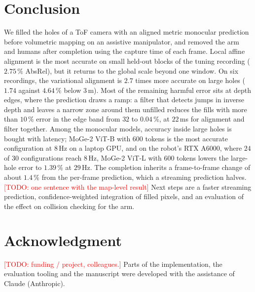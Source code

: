 \documentclass[conference]{IEEEtran}
\newcommand{\todo}[1]{\textcolor{red}{[TODO: #1]}}
\begin{document}
\section{Conclusion}
\label{sec:conclusion}
We filled the holes of a ToF camera with an aligned metric monocular
prediction before volumetric mapping on an assistive manipulator, and removed
the arm and humans after completion using the capture time of each frame. Local
affine alignment is the most accurate on small held-out blocks of the tuning
recording (\(2.75\,\%\) AbsRel), but it returns to the global scale beyond one
window. On six recordings, the variational alignment is \(2.7\) times more
accurate on large holes (\(1.74\) against \(4.64\,\%\) below \(3\,\)m). Most of
the remaining harmful error sits at depth edges, where the prediction draws a
ramp: a filter that detects jumps in inverse depth and leaves a narrow zone
around them unfilled reduces the fills with more than \(10\,\%\) error in the
edge band from \(32\) to \(0.04\,\%\), at \(22\,\)ms for alignment and filter
together. Among the monocular models,
accuracy inside large holes is bought with latency; MoGe-2 ViT-B with \(600\)
tokens is the most accurate configuration at \(8\,\)Hz on a laptop GPU, and on
the robot's RTX A6000, where \(24\) of \(30\) configurations reach \(8\,\)Hz,
MoGe-2 ViT-L with \(600\) tokens lowers the large-hole error to \(1.39\,\%\) at
\(29\,\)Hz.
The completion inherits a frame-to-frame change of about \(1.4\,\%\) from the
per-frame prediction, which a streaming prediction halves. \todo{one sentence with the map-level result} Next steps are
a faster streaming prediction, confidence-weighted integration of filled
pixels, and an evaluation of the effect on collision checking for the arm.

\section*{Acknowledgment}
\todo{funding / project, colleagues.} Parts of the implementation, the
evaluation tooling and the manuscript were developed with the assistance of
Claude (Anthropic).



\end{document}
